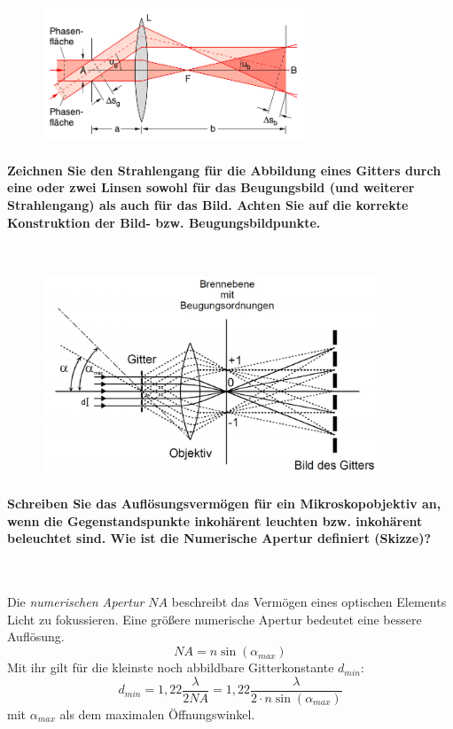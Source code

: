 \documentclass[a4paper, 11pt, ngerman, parskip=half-]{scrartcl}
\newcommand{\NA}{\ensuremath{\mathit{NA}}}
\begin{document}
\begin{figure}[H]
    \centering
    \includegraphics[width=8cm]{image/22/opt23}
\end{figure}


\paragraph{Zeichnen Sie den Strahlengang für die Abbildung eines Gitters durch eine oder zwei Linsen
    sowohl für das Beugungsbild (und weiterer Strahlengang) als auch für das Bild. Achten Sie
    auf die korrekte Konstruktion der Bild- bzw. Beugungsbildpunkte.} ~

\begin{figure}[H]
    \centering
    \includegraphics[width=10cm]{image/22/Gitter_Strahlengang.png}
\end{figure}

\paragraph{Schreiben Sie das Auflösungsvermögen für ein Mikroskopobjektiv an, wenn die
    Gegenstandspunkte inkohärent leuchten bzw. inkohärent beleuchtet sind. Wie ist die Numerische
    Apertur definiert (Skizze)?} ~

Die \textit{numerischen Apertur $\NA$} beschreibt das Vermögen eines optischen Elements Licht zu fokussieren. Eine größere numerische Apertur
bedeutet eine bessere Auflösung.
\begin{equation}
    \NA = n \sin(\alpha_{max})
\end{equation}
Mit ihr gilt für die kleinste noch abbildbare Gitterkonstante $d_{min}$:
\begin{equation}
    d_{min} = 1,22 \frac{\lambda}{2 \NA} = 1,22 \frac{\lambda}{2 \cdot n \sin(\alpha_{max})}
\end{equation}
mit $\alpha_{max}$ als dem maximalen Öffnungswinkel.
\end{document}
